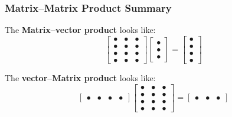 \documentclass[10pt]{beamer}
\begin{document}
\begin{frame}
\frametitle{Matrix--Matrix Product Summary}


The \textbf{Matrix--vector product} looks like:
\begin{equation*}
    \begin{bmatrix}\bullet & \bullet & \bullet \\
                    \bullet & \bullet & \bullet \\
                    \bullet & \bullet & \bullet \\
                    \bullet & \bullet & \bullet \end{bmatrix}
    \begin{bmatrix}\bullet \\ \bullet \\ \bullet \end{bmatrix}
    =
    \begin{bmatrix}\bullet \\ \bullet \\ \bullet \\ \bullet \end{bmatrix}
\end{equation*}

The \textbf{vector--Matrix product} looks like:
\begin{equation*}
    \begin{bmatrix}\bullet & \bullet & \bullet & \bullet \end{bmatrix}
    \begin{bmatrix}\bullet & \bullet & \bullet \\
                    \bullet & \bullet & \bullet \\
                    \bullet & \bullet & \bullet \\
                    \bullet & \bullet & \bullet \end{bmatrix}
    =
    \begin{bmatrix}\bullet & \bullet & \bullet \end{bmatrix}
\end{equation*}

\end{frame}
\end{document}
